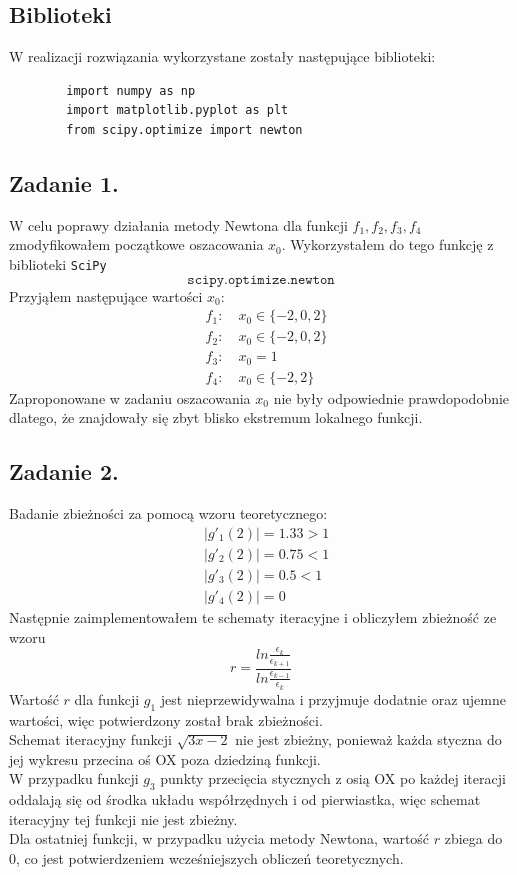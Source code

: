 \documentclass[11pt]{scrartcl}
\begin{document}
    \subsection{Biblioteki}
    W realizacji rozwiązania wykorzystane zostały następujące
    biblioteki:
    \begin{lstlisting}
        import numpy as np
        import matplotlib.pyplot as plt
        from scipy.optimize import newton
    \end{lstlisting}

    \subsection{Zadanie 1.}
    W celu poprawy działania metody Newtona dla funkcji
    $f_1,f_2,f_3,f_4$ zmodyfikowałem początkowe oszacowania
    $x_0$. Wykorzystałem do tego funkcję z biblioteki
    \texttt{SciPy}
    \[
        \texttt{scipy.optimize.newton}
    \]
    Przyjąłem następujące wartości $x_0$:
    \begin{align*}
        &f_1: \quad x_0\in \{-2,0,2\} \\
        &f_2: \quad x_0\in \{-2,0,2\} \\
        &f_3: \quad x_0=1 \\
        &f_4: \quad x_0\in \{-2,2\}
    \end{align*}
    Zaproponowane w zadaniu oszacowania $x_0$ nie były
    odpowiednie prawdopodobnie dlatego, że znajdowały się
    zbyt blisko ekstremum lokalnego funkcji.

    \subsection{Zadanie 2.}
    Badanie zbieżności za pomocą wzoru teoretycznego:
    \begin{align*}
        &|g'_1(2)|=1.33>1 \\
        &|g'_2(2)|=0.75<1 \\
        &|g'_3(2)|=0.5<1 \\
        &|g'_4(2)|=0
    \end{align*}
    Następnie zaimplementowałem te schematy iteracyjne
    i obliczyłem zbieżność ze wzoru
    \[
        r=\frac{ln\frac{\epsilon_k}{\epsilon_{k+1}}}
            {ln\frac{\epsilon_{k-1}}{\epsilon_k}}
    \]
    Wartość $r$ dla funkcji $g_1$ jest nieprzewidywalna
    i przyjmuje dodatnie oraz ujemne wartości, więc
    potwierdzony został brak zbieżności. \\
    Schemat iteracyjny funkcji $\sqrt{3x-2}$ nie jest
    zbieżny, ponieważ każda styczna do jej wykresu
    przecina oś OX poza dziedziną funkcji. \\
    W przypadku funkcji $g_3$ punkty przecięcia
    stycznych z osią OX po każdej iteracji oddalają
    się od środka układu współrzędnych i od pierwiastka,
    więc schemat iteracyjny tej funkcji nie jest
    zbieżny. \\
    Dla ostatniej funkcji, w przypadku użycia metody
    Newtona, wartość $r$ zbiega do 0, co jest
    potwierdzeniem wcześniejszych obliczeń teoretycznych.
    
\end{document}
